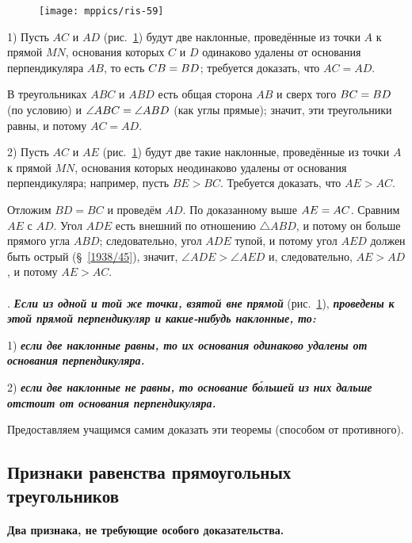 \documentclass[oneside]{book}
\begin{document}
\begin{figure}
\centering
\texttt{[image: mppics/ris-59]}
\caption{}\label{1938/ris-59}
\end{figure}

1) Пусть $AC$ и $AD$ (рис.~\ref{1938/ris-59}) будут две наклонные, проведённые из точки $A$ к прямой $MN$, основания которых $C$ и $D$ одинаково удалены от основания перпендикуляра $AB$, то есть $CB\z=BD$;
требуется доказать, что $AC = AD$.

В треугольниках $ABC$ и $ABD$ есть общая сторона $AB$ и сверх того $BC\z=BD$ (по условию) и $\angle ABC \z= \angle ABD$ (как углы прямые);
значит, эти треугольники равны, и потому $AC = AD$.

2) Пусть $AC$ и $AE$ (рис.~\ref{1938/ris-59}) будут две такие наклонные, проведённые из точки $A$ к прямой $MN$, основания которых неодинаково удалены от основания перпендикуляра;
например, пусть $BE>BC$.
Требуется доказать, что $AE>AC$.

Отложим $BD=BC$ и проведём $AD$.
По доказанному выше $AE \z= AC$.
Сравним $AE$ с $AD$.
Угол $ADE$ есть внешний по отношению $\triangle ABD$, и потому он больше прямого угла $ABD$;
следовательно, угол $ADE$ тупой, и потому угол $AED$ должен быть острый (§~\ref{1938/45}), значит, $\angle ADE>\angle AED$ и, следовательно, $AE>AD$, и потому $AE>AC$.

\paragraph{}\label{1938/55}
.
\textbf{\emph{Если из одной и той же точки, взятой вне прямой}} (рис.~\ref{1938/ris-59}), \textbf{\emph{проведены к этой прямой перпендикуляр и какие-нибудь наклонные, то:}}

1) \textbf{\emph{если две наклонные равны, то их основания одинаково удалены от основания перпендикуляра.}}

2) \textbf{\emph{если две наклонные не равны, то основание б\'{о}льшей из них дальше отстоит от основания перпендикуляра.}}

Предоставляем учащимся самим доказать эти теоремы (способом от противного).

\subsection*{Признаки равенства прямоугольных треугольников}

\paragraph{Два признака, не требующие особого доказательства.}\label{1938/56}
\end{document}
